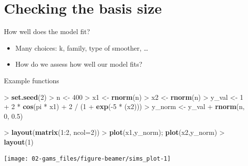\documentclass[10pt,ignorenonframetext,compress, aspectratio=169]{beamer}
\newenvironment{Shaded}{\begin{snugshade}}{\end{snugshade}}
\newcommand{\KeywordTok}[1]{\textcolor[rgb]{0.13,0.29,0.53}{\textbf{{#1}}}}
\newcommand{\DataTypeTok}[1]{\textcolor[rgb]{0.13,0.29,0.53}{{#1}}}
\newcommand{\DecValTok}[1]{\textcolor[rgb]{0.00,0.00,0.81}{{#1}}}
\newcommand{\FloatTok}[1]{\textcolor[rgb]{0.00,0.00,0.81}{{#1}}}
\newcommand{\StringTok}[1]{\textcolor[rgb]{0.31,0.60,0.02}{{#1}}}
\newcommand{\NormalTok}[1]{{#1}}
\providecommand{\tightlist}{%
  \setlength{\itemsep}{0pt}\setlength{\parskip}{0pt}}
\begin{document}
\section{Checking the basis size}\label{checking-the-basis-size}

\begin{frame}{How well does the model fit?}

\begin{itemize}
\tightlist
\item
  Many choices: k, family, type of smoother, \ldots{}
\item
  How do we assess how well our model fits?
\end{itemize}

\end{frame}

\begin{frame}[fragile]{Example functions}

\begin{Shaded}
\begin{Highlighting}[]
\NormalTok{>}\StringTok{ }\KeywordTok{set.seed}\NormalTok{(}\DecValTok{2}\NormalTok{)}
\NormalTok{>}\StringTok{ }\NormalTok{n <-}\StringTok{  }\DecValTok{400}
\NormalTok{>}\StringTok{ }\NormalTok{x1 <-}\StringTok{  }\KeywordTok{rnorm}\NormalTok{(n)}
\NormalTok{>}\StringTok{ }\NormalTok{x2 <-}\StringTok{ }\KeywordTok{rnorm}\NormalTok{(n)}
\NormalTok{>}\StringTok{ }\NormalTok{y_val <-}\StringTok{ }\DecValTok{1} \NormalTok{+}\StringTok{ }\DecValTok{2} \NormalTok{*}\StringTok{ }\KeywordTok{cos}\NormalTok{(pi *}\StringTok{ }\NormalTok{x1) +}\StringTok{ }\DecValTok{2} \NormalTok{/}\StringTok{ }\NormalTok{(}\DecValTok{1} \NormalTok{+}\StringTok{ }\KeywordTok{exp}\NormalTok{(-}\DecValTok{5} \NormalTok{*}\StringTok{ }\NormalTok{(x2)))}
\NormalTok{>}\StringTok{ }\NormalTok{y_norm <-}\StringTok{ }\NormalTok{y_val +}\StringTok{ }\KeywordTok{rnorm}\NormalTok{(n, }\DecValTok{0}\NormalTok{, }\FloatTok{0.5}\NormalTok{)}
\end{Highlighting}
\end{Shaded}

\begin{Shaded}
\begin{Highlighting}[]
\NormalTok{>}\StringTok{ }\KeywordTok{layout}\NormalTok{(}\KeywordTok{matrix}\NormalTok{(}\DecValTok{1}\NormalTok{:}\DecValTok{2}\NormalTok{, }\DataTypeTok{ncol=}\DecValTok{2}\NormalTok{))}
\NormalTok{>}\StringTok{ }\KeywordTok{plot}\NormalTok{(x1,y_norm); }\KeywordTok{plot}\NormalTok{(x2,y_norm)}
\NormalTok{>}\StringTok{ }\KeywordTok{layout}\NormalTok{(}\DecValTok{1}\NormalTok{)}
\end{Highlighting}
\end{Shaded}

\begin{center}\texttt{[image: 02-gams\_files/figure-beamer/sims\_plot-1]} \end{center}

\end{frame}
\end{document}
